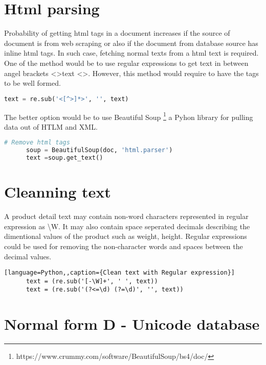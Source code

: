 \section{Html parsing}

Probability of getting html tags in a document increases if the source of document is from web scraping or also if the document from database source has inline html tags. In such case, fetching normal texts from a html text is required. One of the method would be to use regular expressions to get text in between angel brackets \textless \textgreater text \textless \textgreater. However, this method would require to have the tags to be well formed.
\begin{lstlisting}[language=Python, caption={Regular expression to get text from html}]
      text = re.sub('<[^>]*>', '', text)
\end{lstlisting}



The better option would be to use Beautiful Soup \footnote{https://www.crummy.com/software/BeautifulSoup/bs4/doc/} a Pyhon library for pulling data out of HTLM and XML.
\begin{lstlisting}[language=Python, caption={Beautiful soap API to get text from html}]
      # Remove html tags 
      soup = BeautifulSoup(doc, 'html.parser')
      text =soup.get_text()
\end{lstlisting}

\section{Cleanning text}
A product detail text may contain non-word characters represented in regular expression as \textbackslash W. It may also contain space seperated decimals describing the dimentional values of the product such as weight, height. Regular expressions could be used for removing the non-character words and spaces between the decimal values. 

\begin{lstlisting}[language=Python,,caption={Clean text with Regular expression}]
      text = (re.sub('[-\W]+', ' ', text))
      text = (re.sub('(?<=\d) (?=\d)', '', text))
\end{lstlisting}

\section{Normal form D - Unicode database}

